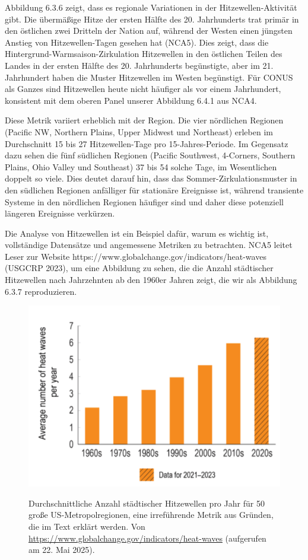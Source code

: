 \documentclass[12pt,paper=a4,DIV=12,parskip=never,chapterprefix=false,headings=standardclasses]{scrreprt}
\begin{document}
Abbildung 6.3.6 zeigt, dass es regionale Variationen in der Hitzewellen-Aktivität gibt. Die übermäßige Hitze der ersten Hälfte des 20. Jahrhunderts trat primär in den östlichen zwei Dritteln der Nation auf, während der Westen einen jüngsten Anstieg von Hitzewellen-Tagen gesehen hat (NCA5). Dies zeigt, dass die Hintergrund-Warmsaison-Zirkulation Hitzewellen in den östlichen Teilen des Landes in der ersten Hälfte des 20. Jahrhunderts begünstigte, aber im 21. Jahrhundert haben die Muster Hitzewellen im Westen begünstigt. Für CONUS als Ganzes sind Hitzewellen heute nicht häufiger als vor einem Jahrhundert, konsistent mit dem oberen Panel unserer Abbildung 6.4.1 aus NCA4.

Diese Metrik variiert erheblich mit der Region. Die vier nördlichen Regionen (Pacific NW, Northern Plains, Upper Midwest und Northeast) erleben im Durchschnitt 15 bis 27 Hitzewellen-Tage pro 15-Jahres-Periode. Im Gegensatz dazu sehen die fünf südlichen Regionen (Pacific Southwest, 4-Corners, Southern Plains, Ohio Valley und Southeast) 37 bis 54 solche Tage, im Wesentlichen doppelt so viele. Dies deutet darauf hin, dass das Sommer-Zirkulationsmuster in den südlichen Regionen anfälliger für stationäre Ereignisse ist, während transiente Systeme in den nördlichen Regionen häufiger sind und daher diese potenziell längeren Ereignisse verkürzen.

Die Analyse von Hitzewellen ist ein Beispiel dafür, warum es wichtig ist, vollständige Datensätze und angemessene Metriken zu betrachten. NCA5 leitet Leser zur Website https://www.globalchange.gov/indicators/heat-waves (USGCRP 2023), um eine Abbildung zu sehen, die die Anzahl städtischer Hitzewellen nach Jahrzehnten ab den 1960er Jahren zeigt, die wir als Abbildung 6.3.7 reproduzieren.

\begin{figure}[H]
\begin{center}
\includegraphics[width=1.0\textwidth]{bilder/bilderKlima-0048.png}\\[1cm]
\end{center}
\caption{Durchschnittliche Anzahl städtischer Hitzewellen pro Jahr für 50 große US-Metropolregionen, eine irreführende Metrik aus Gründen, die im Text erklärt werden. Von \url{https://www.globalchange.gov/indicators/heat-waves} (aufgerufen am 22. Mai 2025).}
\end{figure}
\end{document}
